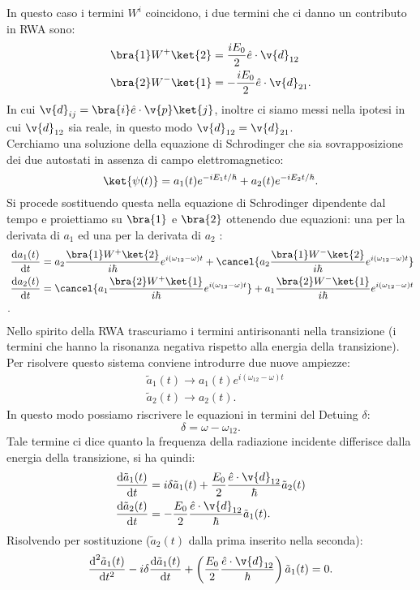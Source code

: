 In questo caso i termini $W^i$ coincidono, i due termini che ci danno un contributo in RWA sono:
\[\begin{aligned}
    &\bra{1}W^+\ket{2} = \frac{iE_0}{2}\hat{e}\cdot \v{d}_{12}\\
    &\bra{2}W^-\ket{1} = -\frac{iE_0}{2}\hat{e}\cdot \v{d}_{21}
.\end{aligned}\]
In cui $\v{d}_{ij}=\bra{i}\hat{e}\cdot \v{p}\ket{j}$, inoltre ci siamo messi nella ipotesi in cui $\v{d}_{12}$ sia reale, in questo modo $\v{d}_{12}=\v{d}_{21}$.\\
Cerchiamo una soluzione della equazione di Schrodinger che sia sovrapposizione dei due autostati in assenza di campo elettromagnetico:
\[
    \ket{\psi(t) } = a_1(t) e^{-iE_1t /\hbar } + a_2(t) e^{-iE_2t /\hbar } 
.\] 
Si procede sostituendo questa nella equazione di Schrodinger dipendente dal tempo e proiettiamo su $\bra{1}$ e $\bra{2}$ ottenendo due equazioni: una per la derivata di $a_1$ ed una per la derivata di $a_2$ :
\[\begin{aligned}
    &\frac{\text{d} a_1(t) }{\text{d} t} =
    a_2 \frac{\bra{1}W^+\ket{2}}{i\hbar }e^{i(\omega_{12}-\omega) t}
    +
    \cancel{a_2\frac{\bra{1}W^-\ket{2}}{i\hbar }e^{i(\omega_{12}-\omega) t}}\\
    &\frac{\text{d} a_2(t) }{\text{d} t} =
    \cancel{a_1 \frac{\bra{2}W^+\ket{1}}{i\hbar }e^{i(\omega_{12}-\omega) t}}
    +
    a_1\frac{\bra{2}W^-\ket{1}}{i\hbar }e^{i(\omega_{12}-\omega) t}\\
.\end{aligned}\]
Nello spirito della RWA trascuriamo i termini antirisonanti  nella transizione (i termini che hanno la risonanza negativa rispetto alla energia della transizione).\\
Per risolvere questo sistema conviene introdurre due nuove ampiezze:
\[\begin{aligned}
    &\tilde{a}_1(t) \to a_1(t) e^{i(\omega_{12}-\omega) t}\\
    &\tilde{a}_2(t) \to a_2(t)
.\end{aligned}\]
In questo modo possiamo riscrivere le equazioni in termini del Detuing $\delta$:
\[
\delta  = \omega-\omega_{12}
.\] 
Tale termine ci dice quanto la frequenza della radiazione incidente differisce dalla energia della transizione, si ha quindi:
\[\begin{aligned}
    &\frac{\text{d} \tilde{a}_1(t) }{\text{d} t} = i \delta\tilde{a}_1(t) 
    + \frac{E_0}{2}\frac{\hat{e}\cdot \v{d}_{12}}{\hbar }\tilde{a}_2(t) \\
    &\frac{\text{d} \tilde{a}_2(t)}{\text{d} t} = -\frac{E_0}{2}\frac{\hat{e}\cdot \v{d}_{12}}{\hbar }\tilde{a}_1(t) 
.\end{aligned}\]
Risolvendo per sostituzione ($\tilde{a}_2(t)$ dalla prima inserito nella seconda):
\[
    \frac{\text{d} ^2\tilde{a}_1(t) }{\text{d} t^2} 
    - i\delta\frac{\text{d} \tilde{a}_1(t) }{\text{d} t}
    + \left(\frac{E_0}{2}\frac{\hat{e}\cdot \v{d}_{12}}{\hbar }\right)
    \tilde{a}_1(t) = 0
.\] 
